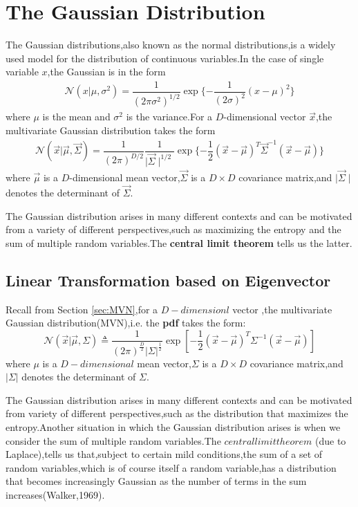 \section{The Gaussian Distribution}
\label{sec:Gaussian distribution}
The Gaussian distributions,also known as the normal distributions,is a widely used model for the distribution of continuous variables.In the case of single variable $x$,the Gaussian is in the form
\begin{align}\label{eqn:univariate Gaussian distributions}
\mathcal{N}(x|\mu,\sigma^2)=\dfrac{1}{(2\pi\sigma^2)^{1/2}}\exp\{-\dfrac{1}{(2\sigma)^2}(x-\mu)^2 \}
\end{align}
where $\mu$ is the mean and $\sigma^2$ is the variance.For a $D$-dimensional vector $\vec{x}$,the multivariate Gaussian distribution takes the form
\begin{align}\label{eqn:multivariate Gaussian}
	\mathcal{N}(\vec{x}|\vec{\mu},\vec{\Sigma})
	=\dfrac{1}{(2\pi)^{D/2}}\dfrac{1}{\mid \vec{\Sigma}\mid^{1/2}}
	\exp\{-\dfrac{1}{2}(\vec{x}-\vec{\mu})^T\vec{\Sigma}^{-1}(\vec{x}-\vec{\mu}) \}
\end{align}
where $\vec{\mu}$ is a $D$-dimensional mean vector,$\vec{\Sigma}$ is a $D\times D$ covariance matrix,and $\mid\vec{\Sigma}\mid$ denotes the determinant of $\vec{\Sigma}$.

The Gaussian distribution arises in many different contexts and can be motivated from a variety of different perspectives,such as maximizing the entropy and the sum of multiple random variables.The \textbf{central limit theorem} tells us the latter.
\subsection{Linear Transformation based on Eigenvector}
Recall from Section \ref{sec:MVN},for a $D-dimensionl$ vector ,the multivariate Gaussian distribution(MVN),i.e. the \textbf{pdf} takes the form:
\begin{equation}
\mathcal{N}(\vec{x}|\vec{\mu},\Sigma) \triangleq \dfrac{1}{(2\pi)^{\frac{D}{2}}|\Sigma|^{\frac{1}{2}}}\exp\left[-\dfrac{1}{2}(\vec{x}-\vec{\mu})^T\Sigma^{-1}(\vec{x}-\vec{\mu})\right]
\end{equation}
where $\mu$ is a $D-dimensional$ mean vector,$\Sigma$ is a $D\times D$ covariance matrix,and $|\Sigma|$ denotes the determinant of $\Sigma$.

The Gaussian distribution arises in many different contexts and can be motivated from variety of different
perspectives,such as the distribution that maximizes the entropy.Another situation in which the Gaussian distribution arises is when we consider the sum of multiple random variables.The $central limit theorem$ (due to Laplace),tells us that,subject to certain mild conditions,the sum of a set of random variables,which is of course itself a random variable,has a distribution that becomes increasingly Gaussian as the number of terms in the sum increases(Walker,1969).

